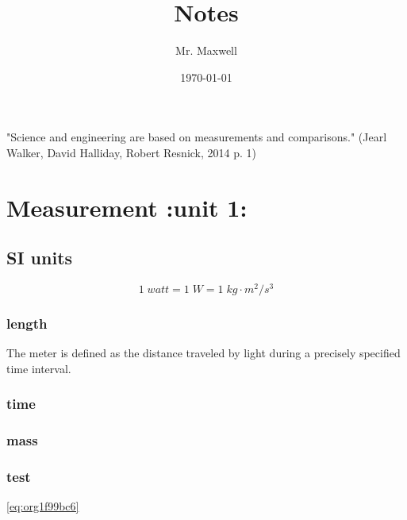 \documentclass[11pt]{article}
\author{Mr. Maxwell}
\date{\today}
\title{Notes}
\begin{document}
\maketitle
\tableofcontents

"Science and engineering are based on measurements and comparisons." (Jearl Walker, David Halliday, Robert Resnick, 2014 p. 1)
\section{Measurement                                                      :unit 1:}
\label{sec:org2fd51d7}

\subsection{SI units}
\label{sec:org524d4bf}

\begin{equation}
\label{eq:org1f99bc6}
    1 \; watt = 1\; W = 1 \; kg \cdot m^2/s^3
\end{equation}
\subsubsection{length}
\label{sec:org7557978}

The meter is defined as the distance traveled by light during a precisely specified time interval.
\subsubsection{time}
\label{sec:org530a48e}

\subsubsection{mass}
\label{sec:org258b034}

\subsubsection{test}
\label{sec:org4bdbaf5}

\ref{eq:org1f99bc6}
\end{document}
